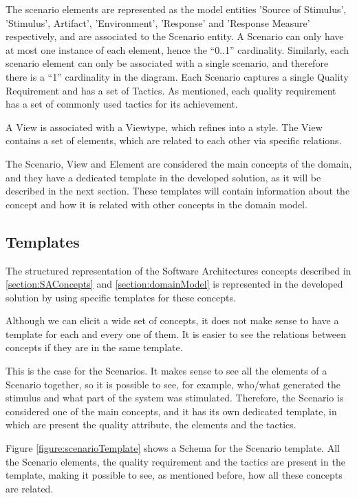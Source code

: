 The scenario elements are represented as the model entities 'Source of Stimulus', 'Stimulus', Artifact', 'Environment', 'Response' and 'Response Measure' respectively, and are associated to the Scenario entity. A Scenario can only have at most one instance of each element, hence the ``0..1'' cardinality. Similarly, each scenario element can only be associated with a single scenario, and therefore there is a ``1'' cardinality in the diagram. Each Scenario captures a single Quality Requirement and has a set of Tactics. As mentioned, each quality requirement has a set of commonly used tactics for its achievement.

A View is associated with a Viewtype, which refines into a style. The View contains a set of elements, which are related to each other via specific relations.

The Scenario, View and Element are considered the main concepts of the domain, and they have a dedicated template in the developed solution, as it will be described in the next section. These templates will contain information about the concept and how it is related with other concepts in the domain model.

\subsection{Templates}
\label{section:templates}
The structured representation of the Software Architectures concepts described in \ref{section:SAConcepts} and \ref{section:domainModel} is represented in the developed solution by using specific templates for these concepts.

Although we can elicit a wide set of concepts, it does not make sense to have a template for each and every one of them. It is easier to see the relations between concepts if they are in the same template. 

This is the case for the Scenarios. It makes sense to see all the elements of a Scenario together, so it is possible to see, for example, who/what generated the stimulus and what part of the system was stimulated. Therefore, the Scenario is considered one of the main concepts, and it has its own dedicated template, in which are present the quality attribute, the elements and the tactics. 

Figure \ref{figure:scenarioTemplate} shows a Schema for the Scenario template. All the Scenario elements, the quality requirement and the tactics are present in the template, making it possible to see, as mentioned before, how all these concepts are related.

